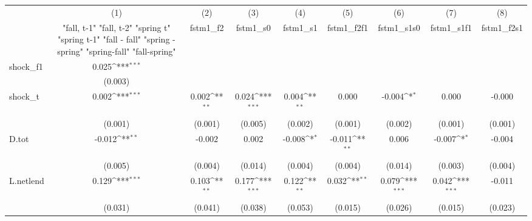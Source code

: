 {
\def\sym#1{\ifmmode^{#1}\else\(^{#1}\)\fi}
\begin{tabular}{l*{8}{c}}
\toprule
            &\multicolumn{1}{c}{(1)}&\multicolumn{1}{c}{(2)}&\multicolumn{1}{c}{(3)}&\multicolumn{1}{c}{(4)}&\multicolumn{1}{c}{(5)}&\multicolumn{1}{c}{(6)}&\multicolumn{1}{c}{(7)}&\multicolumn{1}{c}{(8)}\\
            &\multicolumn{1}{c}{  "fall, t-1" "fall, t-2" "spring t" "spring t-1"  "fall - fall" "spring - spring" "spring-fall" "fall-spring" }&\multicolumn{1}{c}{fstm1\_f2}&\multicolumn{1}{c}{fstm1\_s0}&\multicolumn{1}{c}{fstm1\_s1}&\multicolumn{1}{c}{fstm1\_f2f1}&\multicolumn{1}{c}{fstm1\_s1s0}&\multicolumn{1}{c}{fstm1\_s1f1}&\multicolumn{1}{c}{fstm1\_f2s1}\\
\midrule
shock\_f1    &       0.025\sym{***}&                     &                     &                     &                     &                     &                     &                     \\
            &     (0.003)         &                     &                     &                     &                     &                     &                     &                     \\
\addlinespace
shock\_t     &       0.002\sym{***}&       0.002\sym{**} &       0.024\sym{***}&       0.004\sym{**} &       0.000         &      -0.004\sym{*}  &       0.000         &      -0.000         \\
            &     (0.001)         &     (0.001)         &     (0.005)         &     (0.002)         &     (0.001)         &     (0.002)         &     (0.001)         &     (0.001)         \\
\addlinespace
D.tot       &      -0.012\sym{**} &      -0.002         &       0.002         &      -0.008\sym{*}  &      -0.011\sym{**} &       0.006         &      -0.007\sym{*}  &      -0.004         \\
            &     (0.005)         &     (0.004)         &     (0.014)         &     (0.004)         &     (0.004)         &     (0.014)         &     (0.003)         &     (0.004)         \\
\addlinespace
L.netlend   &       0.129\sym{***}&       0.103\sym{**} &       0.177\sym{***}&       0.122\sym{**} &       0.032\sym{**} &       0.079\sym{***}&       0.042\sym{***}&      -0.011         \\
            &     (0.031)         &     (0.041)         &     (0.038)         &     (0.053)         &     (0.015)         &     (0.026)         &     (0.015)         &     (0.023)         \\

\end{tabular}}
